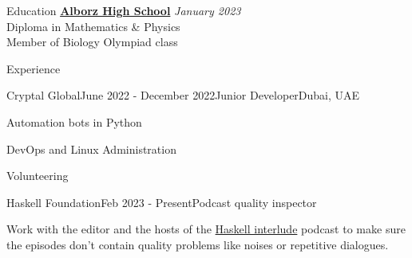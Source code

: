 \documentclass[
	a4paper,
	11pt,
]{resume}
\begin{document}
\begin{rSection}{Education}
	\href{https://en.wikipedia.org/wiki/Alborz_High_School}{\textbf{Alborz High School}} \hfill \textit{January 2023} \\
	Diploma in Mathematics \& Physics \\
    Member of Biology Olympiad class \\
\end{rSection}

\begin{rSection}{Experience}

  \begin{rSubsection}{Cryptal Global}{June 2022 - December 2022}{Junior Developer}{Dubai, UAE}
  \item Automation bots in Python
  \item DevOps and Linux Administration
  \end{rSubsection}

\end{rSection}

\begin{rSection}{Volunteering}

  \begin{rSubsection}{Haskell Foundation}{Feb 2023 - Present}{Podcast quality inspector}{}
  \item Work with the editor and the hosts of the \href{https://haskell.foundation/podcast/}{Haskell interlude}
        podcast to make sure the episodes don't contain quality problems like noises or repetitive dialogues.
  \end{rSubsection}

\end{rSection}
\end{document}
